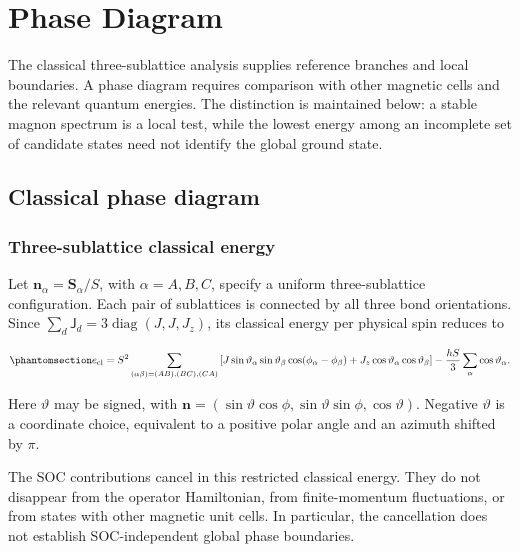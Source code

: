 \clearpage

\section{Phase Diagram}\label{sec-nbcp-phases}

The classical three-sublattice analysis supplies reference branches and
local boundaries. A phase diagram requires comparison with other
magnetic cells and the relevant quantum energies. The distinction is
maintained below: a stable magnon spectrum is a local test, while the
lowest energy among an incomplete set of candidate states need not
identify the global ground state.

\subsection{Classical phase diagram}\label{sec-nbcp-classical-phases}

\subsubsection{Three-sublattice classical
energy}\label{three-sublattice-classical-energy}

Let \(\mathbf n_\alpha=\mathbf S_\alpha/S\), with \(\alpha=A,B,C\),
specify a uniform three-sublattice configuration. Each pair of
sublattices is connected by all three bond orientations. Since
\(\sum_d\mathsf J_d=3\operatorname{diag}(J,J,J_z)\), its classical
energy per physical spin reduces to

\begin{equation}\phantomsection\label{eq-nbcp-three-energy}{
e_{\rm cl}=S^2\sum_{(\alpha\beta)=(AB),(BC),(CA)}
\left[J\sin\vartheta_\alpha\sin\vartheta_\beta
\cos(\phi_\alpha-\phi_\beta)
+J_z\cos\vartheta_\alpha\cos\vartheta_\beta\right]
-\frac{hS}{3}\sum_\alpha\cos\vartheta_\alpha.
}\end{equation}

Here \(\vartheta\) may be signed, with
\(\mathbf n=(\sin\vartheta\cos\phi,\sin\vartheta\sin\phi,\cos\vartheta)\).
Negative \(\vartheta\) is a coordinate choice, equivalent to a positive
polar angle and an azimuth shifted by \(\pi\).

The SOC contributions cancel in this restricted classical energy. They
do not disappear from the operator Hamiltonian, from finite-momentum
fluctuations, or from states with other magnetic unit cells. In
particular, the cancellation does not establish SOC-independent global
phase boundaries.

